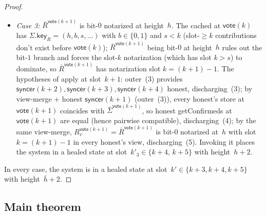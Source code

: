 \documentclass{article}
\newcommand{\key}{\mathsf{key}}
\newcommand{\syncer}{\mathsf{syncer}}
\newcommand{\vote}{\mathsf{vote}}
\newcommand{\comm}[1]{\bar{#1}}
\newcommand{\getConfirmed}{\textsf{getConfirmed}\xspace}
\theoremstyle{plain}
\theoremstyle{definition}
\theoremstyle{remark}
\begin{document}
\begin{proof}
\begin{itemize}
  \item \emph{Case 3:} $\comm{R}^{\vote(k+1)}$ is bit-$0$ notarized at height~$h$. The cached at $\vote(k)$ has $\Sigma.\key_R = (h, b, s, \ldots)$ with $b \in \{0, 1\}$ and $s < k$ (slot-$\geq k$ contributions don't exist before $\vote(k)$); $\comm{R}^{\vote(k+1)}$ being bit-$0$ at height~$h$ rules out the bit-$1$ branch and forces the slot-$k$ notarization (which has slot $k > s$) to dominate, so $\comm{R}^{\vote(k+1)}$ has notarization slot $k = (k+1) - 1$. The hypotheses of  apply at slot~$k+1$: outer~(3) provides $\syncer(k+2), \syncer(k+3), \syncer(k+4)$ honest, discharging~(3); by view-merge + honest $\syncer(k+1)$ (outer~(3)), every honest's store at $\vote(k+1)$ coincides with $\comm{\Sigma}^{\vote(k+1)}$, so honest \getConfirmed{}s at $\vote(k+1)$ are equal (hence pairwise compatible), discharging~(4); by the same view-merge, $R_v^{\vote(k+1)} = \comm{R}^{\vote(k+1)}$ is bit-$0$ notarized at~$h$ with slot $k = (k+1)-1$ in every honest's view, discharging~(5). Invoking it places the system in a healed state at slot~$k'_3 \in \{k+4,\, k+5\}$ with height~$h+2$.
\end{itemize}

In every case, the system is in a healed state at slot~$k' \in \{k+3, k+4, k+5\}$ with height~$\comm{h}+2$.
\end{proof}


\subsection{Main theorem}\label{rev:sec:healing-main}
\end{document}
